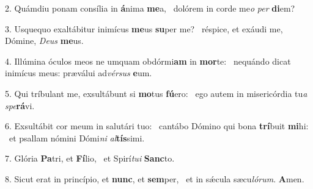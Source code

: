 2. Quámdiu ponam consília in \textbf{á}nima \textbf{me}a, \ast\  dolórem in corde me\textit{o} \textit{per} \textbf{di}em?\

3. Usquequo exaltábitur inimícus \textbf{me}us \textbf{su}per me? \ast\  réspice, et exáudi me, Dómine, \textit{De}\textit{us} \textbf{me}us.\

4. Illúmina óculos meos ne umquam obdórmi\textbf{am} in \textbf{mor}te: \ast\  nequándo dicat inimícus meus: præválui ad\textit{vér}\textit{sus} \textbf{e}um.\

5. Qui tríbulant me, exsultábunt si \textbf{mo}tus \textbf{fú}ero: \ast\  ego autem in misericórdia tu\textit{a} \textit{spe}\textbf{rá}vi.\

6. Exsultábit cor meum in salutári tuo: \dag\  cantábo Dómino qui bona \textbf{trí}buit \textbf{mi}hi: \ast\  et psallam nómini Dómi\textit{ni} \textit{al}\textbf{tís}simi.\

7. Glória \textbf{Pa}tri, et \textbf{Fí}lio, \ast\  et Spirí\textit{tu}\textit{i} \textbf{Sanc}to.\

8. Sicut erat in princípio, et \textbf{nunc}, et \textbf{sem}per, \ast\  et in sǽcula sæcu\textit{ló}\textit{rum}. \textbf{A}men.\

